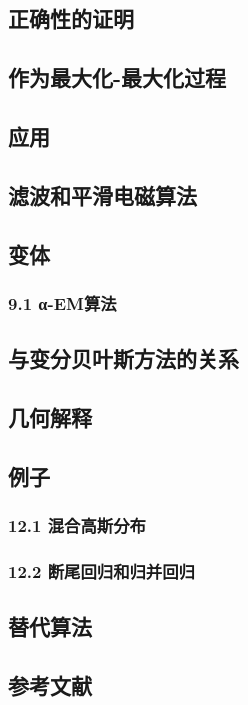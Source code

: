 \subsection{正确性的证明}



\subsection{作为最大化-最大化过程}



\subsection{应用}



\subsection{滤波和平滑电磁算法}



\subsection{变体}



\subsubsection{9.1 α-EM算法}



\subsection{与变分贝叶斯方法的关系}



\subsection{几何解释}



\subsection{例子}

\subsubsection{12.1 混合高斯分布}



\subsubsection{12.2 断尾回归和归并回归}



\subsection{替代算法}



\subsection{参考文献}
